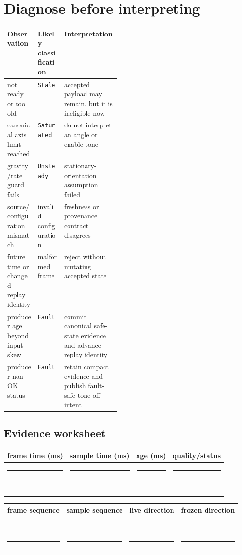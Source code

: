 \documentclass[11pt]{article}
\newcommand{\blankline}{\rule{0.86in}{0.4pt}}
\begin{document}
\section{Diagnose before interpreting}
\begin{tabularx}{\linewidth}{@{}>{\raggedright\arraybackslash}p{0.27\linewidth} l X@{}}
\toprule
Observation & Likely classification & Interpretation\\
\midrule
not ready or too old & \texttt{Stale} & accepted payload may remain, but it
is ineligible now\\
canonical axis limit reached & \texttt{Saturated} & do not interpret an
angle or enable tone\\
gravity/rate guard fails & \texttt{Unsteady} & stationary-orientation
assumption failed\\
source/configuration mismatch & invalid configuration & freshness or
provenance contract disagrees\\
future time or changed replay identity & malformed frame & reject without
mutating accepted state\\
producer age beyond input skew & \texttt{Fault} & commit canonical safe-state
evidence and advance replay identity\\
producer non-OK status & \texttt{Fault} & retain compact evidence and publish
fault-safe tone-off intent\\
\bottomrule
\end{tabularx}

\subsection*{Evidence worksheet}
\begin{tabularx}{\linewidth}{@{}X X X X@{}}
\toprule
frame time (ms) & sample time (ms) & age (ms) & quality/status\\
\midrule
\rule{0pt}{16pt}\blankline & \blankline & \blankline & \blankline\\[9pt]
\blankline & \blankline & \blankline & \blankline\\
\bottomrule
\end{tabularx}

\begin{tabularx}{\linewidth}{@{}X X X X@{}}
\toprule
frame sequence & sample sequence & live direction & frozen direction\\
\midrule
\rule{0pt}{16pt}\blankline & \blankline & \blankline & \blankline\\[9pt]
\blankline & \blankline & \blankline & \blankline\\
\bottomrule
\end{tabularx}
\end{document}
